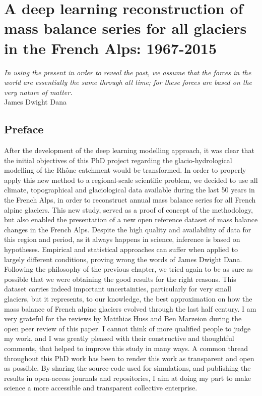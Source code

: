 \chapter{A deep learning reconstruction of mass balance series for all glaciers in the French Alps: 1967-2015}
\label{chap:past}

\begin{flushright}
{\small \textit{In using the present in order to reveal the past, we assume that the forces in the world are essentially the same through all time; for these forces are based on the very nature of matter.}\\
James Dwight Dana}
\end{flushright}

\section*{Preface}

After the development of the deep learning modelling approach, it was clear that the initial objectives of this PhD project regarding the glacio-hydrological modelling of the Rhône catchment would be transformed. In order to properly apply this new method to a regional-scale scientific problem, we decided to use all climate, topographical and glaciological data available during the last 50 years in the French Alps, in order to reconstruct annual mass balance series for all French alpine glaciers. This new study, served as a proof of concept of the methodology, but also enabled the presentation of a new open reference dataset of mass balance changes in the French Alps. Despite the high quality and availability of data for this region and period, as it always happens in science, inference is based on hypotheses. Empirical and statistical approaches can suffer when applied to largely different conditions, proving wrong the words of James Dwight Dana. Following the philosophy of the previous chapter, we tried again to be as sure as possible that we were obtaining the good results for the right reasons. This dataset carries indeed important uncertainties, particularly for very small glaciers, but it represents, to our knowledge, the best approximation on how the mass balance of French alpine glaciers evolved through the last half century. I am very grateful for the reviews by Matthias Huss and Ben Marzeion during the open peer review of this paper. I cannot think of more qualified people to judge my work, and I was greatly pleased with their constructive and thoughtful comments, that helped to improve this study in many ways. A common thread throughout this PhD work has been to render this work as transparent and open as possible. By sharing the source-code used for simulations, and publishing the results in open-access journals and repositories, I aim at doing my part to make science a more accessible and transparent collective enterprise. 

